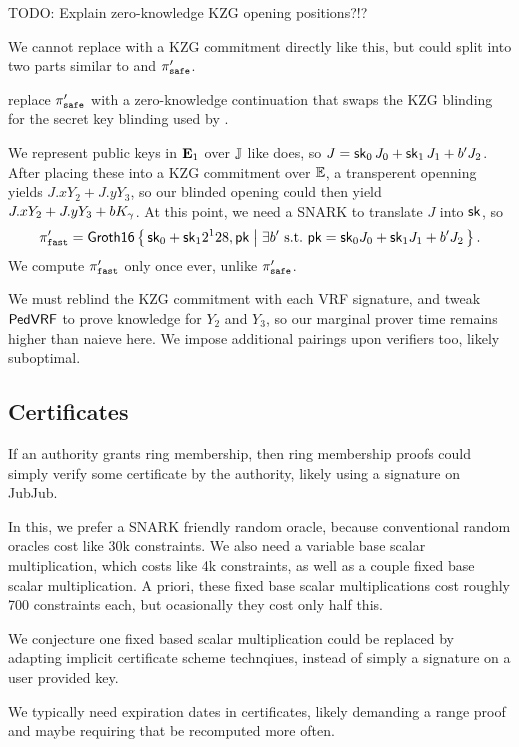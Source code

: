 TODO: Explain zero-knowledge KZG opening positions?!?

We cannot replace \pifast with a KZG commitment directly like this,
but could split \pifast into two parts similar to \pisafe and $\pi_{\mathtt{safe}}'$.

replace $\pi_{\mathtt{safe}}'$ with a zero-knowledge continuation
that swaps the KZG blinding for the secret key blinding used by \pifast.

We represent public keys in ${\mathbf{E}}_1$ over ${\mathbb{J}}$ like \pifast does,
so $J = \mathsf{sk}_0\, J_0 + \mathsf{sk}_1\, J_1 + b' J_2$.
After placing these into a KZG commitment over ${\mathbb{E}}$, a transperent
openning yields $J.x Y_2 + J.y Y_3$, so our blinded opening could
then yield $J.x Y_2 + J.y Y_3 + b K_\gamma$.
At this point, we need a SNARK to translate $J$ into $\mathsf{sk}$, so
$$ \pifast' = \rrSNARK \Setst{ \sk_0 + \sk_1 2^128, \pk }{ 
 \exists b' \textrm{\ s.t.\ }
 \pk = \sk_0 \genJ_0 + \sk_1 \genJ_1 + b' \genJ_2
} \mathperiod $$
We compute $\pi_{\mathtt{fast}}'$ only once ever, unlike $\pi_{\mathtt{safe}}'$.

We must reblind the KZG commitment with each VRF signature, and
tweak ${\mathsf{PedVRF}}$ to prove knowledge for $Y_2$ and $Y_3$, so 
our marginal prover time remains higher than naieve \pifast here.
We impose additional pairings upon verifiers too, likely suboptimal.


\subsection{Certificates} %

If an authority grants ring membership, then ring membership proofs
could simply verify some certificate by the authority, likely using
a signature on JubJub.

In this, we prefer a SNARK friendly random oracle,
because conventional random oracles cost like 30k constraints.
We also need a variable base scalar multiplication, which costs like
4k constraints, as well as a couple fixed base scalar multiplication.
A priori, these fixed base scalar multiplications cost roughly 700
constraints each, but ocasionally they cost only half this.   

We conjecture one fixed based scalar multiplication could be replaced
by adapting implicit certificate scheme technqiues,
 instead of simply a signature on a user provided key.

We typically need expiration dates in certificates, likely demanding
a range proof and maybe requiring that \pifast be recomputed more often.

